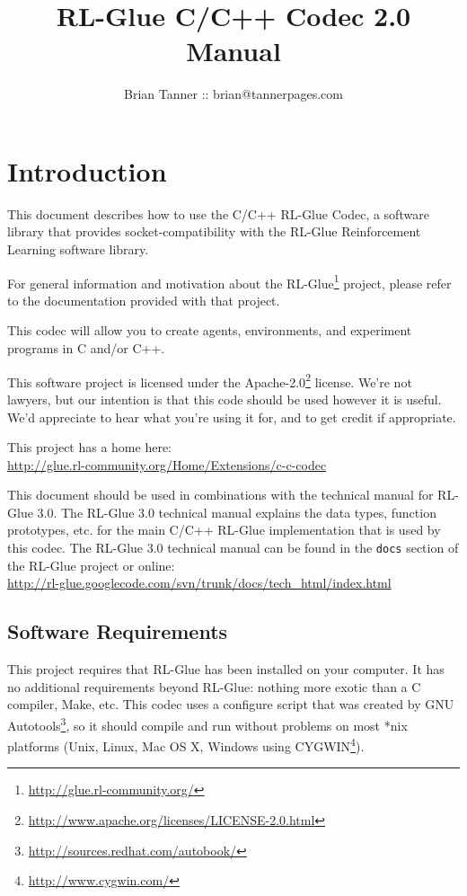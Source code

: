 \documentclass[11pt]{article}
\title{RL-Glue C/C++ Codec 2.0 Manual }
\author{Brian Tanner :: brian@tannerpages.com}
\date{}
\begin{document}
\maketitle
\tableofcontents

\section{Introduction}

This document describes how to use the C/C++ RL-Glue Codec, a software library that provides socket-compatibility with the RL-Glue Reinforcement Learning software library.  

For general information and motivation about the RL-Glue\footnote{\url{http://glue.rl-community.org/}} project, please refer to the documentation provided with that project.

This codec will allow you to create agents, environments, and experiment programs in C and/or C++.

This software project is licensed under the Apache-2.0\footnote{\url{http://www.apache.org/licenses/LICENSE-2.0.html}} license. We're not lawyers, but our intention is that this code 
should be used however it is useful.  We'd appreciate to hear what you're using it for, and to get credit if appropriate.

This project has a home here:\\
\url{http://glue.rl-community.org/Home/Extensions/c-c-codec}

This document should be used in combinations with the technical manual for RL-Glue 3.0.  The RL-Glue 3.0 technical manual explains the data types, function prototypes, etc. for the main C/C++ RL-Glue implementation that is used
by this codec.  The RL-Glue 3.0 technical manual can be found in the \texttt{docs} section of the RL-Glue project or online:\\
\url{http://rl-glue.googlecode.com/svn/trunk/docs/tech_html/index.html}

\subsection{Software Requirements}
This project requires that RL-Glue has been installed on your computer.  It has no additional requirements beyond RL-Glue: nothing more exotic than a C compiler, Make, etc.  This codec uses a configure script that was created by GNU Autotools\footnote{\url{http://sources.redhat.com/autobook/}}, so it should compile and run without problems on most *nix platforms (Unix, Linux, Mac OS X, Windows using CYGWIN\footnote{\url{http://www.cygwin.com/}}). 
\end{document}
